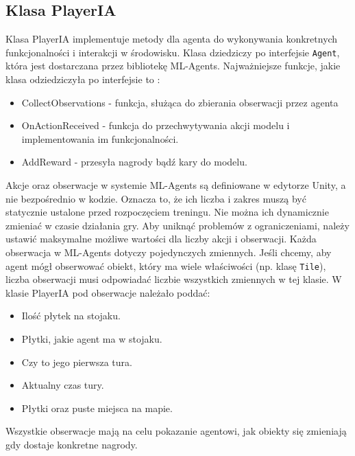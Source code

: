\documentclass[a4paper,twoside,12pt]{book}
\begin{document}
	\subsection{Klasa PlayerIA}
		Klasa PlayerIA implementuje metody dla agenta do wykonywania konkretnych funkcjonalności i interakcji w środowisku. Klasa dziedziczy po interfejsie \texttt{Agent}, która jest dostarczana przez bibliotekę ML-Agents.
		Najważniejsze funkcje, jakie klasa odziedziczyła po interfejsie to :
		\begin{itemize}
			\item CollectObservations - funkcja, służąca do zbierania obserwacji przez agenta
			\item OnActionReceived - funkcja do przechwytywania akcji modelu i implementowania im funkcjonalności. 
			\item AddReward - przesyła nagrody bądź kary do modelu.
		\end{itemize}
		Akcje oraz obserwacje w systemie ML-Agents są definiowane w edytorze Unity, a nie bezpośrednio w kodzie. Oznacza to, że ich liczba i zakres muszą być statycznie ustalone przed rozpoczęciem treningu. Nie można ich dynamicznie zmieniać w czasie działania gry. Aby uniknąć problemów z ograniczeniami, należy ustawić maksymalne możliwe wartości dla liczby akcji i obserwacji.
		Każda obserwacja w ML-Agents dotyczy pojedynczych zmiennych. Jeśli chcemy, aby agent mógł obserwować obiekt, który ma wiele właściwości (np. klasę \texttt{Tile}), liczba obserwacji musi odpowiadać liczbie wszystkich zmiennych w tej klasie.
		W klasie PlayerIA pod obserwacje należało poddać:
		\begin{itemize}
			\item Ilość płytek na stojaku.
			\item Płytki, jakie agent ma w stojaku.
			\item Czy to jego pierwsza tura.
			\item Aktualny czas tury.
			\item Płytki oraz puste miejsca na mapie.
		\end{itemize}
		Wszystkie obserwacje mają na celu pokazanie agentowi, jak obiekty się zmieniają gdy dostaje konkretne nagrody.
		
\end{document}
